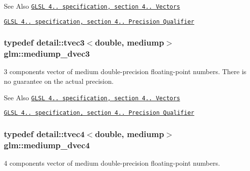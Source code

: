 \begin{DoxySeeAlso}{See Also}
\href{http://www.opengl.org/registry/doc/GLSLangSpec.4.20.8.pdf}{\tt G\-L\-S\-L 4.. specification, section 4.. Vectors} 

\href{http://www.opengl.org/registry/doc/GLSLangSpec.4.20.8.pdf}{\tt G\-L\-S\-L 4.. specification, section 4.. Precision Qualifier} 
\end{DoxySeeAlso}
\hypertarget{group__core__precision_gac051f0702cb0e717db5dd913f6261388}{
\subsubsection[{mediump\-\_\-dvec3}]{\setlength{\rightskip}{0pt plus 5cm}typedef detail\-::tvec3$<$double, mediump$>$ {\bf glm\-::mediump\-\_\-dvec3}}}\label{group__core__precision_gac051f0702cb0e717db5dd913f6261388}
3 components vector of medium double-\/precision floating-\/point numbers. There is no guarantee on the actual precision.

\begin{DoxySeeAlso}{See Also}
\href{http://www.opengl.org/registry/doc/GLSLangSpec.4.20.8.pdf}{\tt G\-L\-S\-L 4.. specification, section 4.. Vectors} 

\href{http://www.opengl.org/registry/doc/GLSLangSpec.4.20.8.pdf}{\tt G\-L\-S\-L 4.. specification, section 4.. Precision Qualifier} 
\end{DoxySeeAlso}
\hypertarget{group__core__precision_gac61cf2fc2df895e5f277c978dace042a}{
\subsubsection[{mediump\-\_\-dvec4}]{\setlength{\rightskip}{0pt plus 5cm}typedef detail\-::tvec4$<$double, mediump$>$ {\bf glm\-::mediump\-\_\-dvec4}}}\label{group__core__precision_gac61cf2fc2df895e5f277c978dace042a}
4 components vector of medium double-\/precision floating-\/point numbers.

